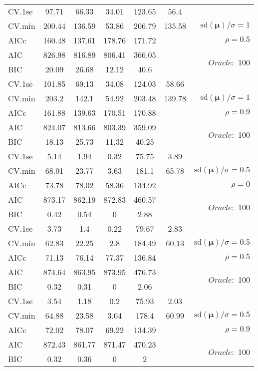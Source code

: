 \begin{table}
\begin{center}
\begin{tabular}{l*{5}{c}|r}
 \hline 
CV.1se & 97.71 & 66.33 & 34.01 & 123.65 & 56.4 & \\
CV.min & 200.44 & 136.59 & 53.86 & 206.79 & 135.58 &  $\mathrm{sd}(\mathbf{\mu})/\sigma=1$ \\
AICc & 160.48 & 137.61 & 178.76 & 171.72 & & $\rho=0.5$ \\
AIC & 826.98 & 816.89 & 806.41 & 366.05 & &  \multirow{2}{*}{$Oracle: $ 100} \\
BIC & 20.09 & 26.68 & 12.12 & 40.6 & &  \\
 \hline 
CV.1se & 101.85 & 69.13 & 34.08 & 124.03 & 58.66 & \\
CV.min & 203.2 & 142.1 & 54.92 & 203.48 & 139.78 &  $\mathrm{sd}(\mathbf{\mu})/\sigma=1$ \\
AICc & 161.88 & 139.63 & 170.51 & 170.88 & & $\rho=0.9$ \\
AIC & 824.07 & 813.66 & 803.39 & 359.09 & &  \multirow{2}{*}{$Oracle: $ 100} \\
BIC & 18.13 & 25.73 & 11.32 & 40.25 & &  \\
 \hline 
CV.1se & 5.14 & 1.94 & 0.32 & 75.75 & 3.89 & \\
CV.min & 68.01 & 23.77 & 3.63 & 181.1 & 65.78 &  $\mathrm{sd}(\mathbf{\mu})/\sigma=0.5$ \\
AICc & 73.78 & 78.02 & 58.36 & 134.92 & & $\rho=0$ \\
AIC & 873.17 & 862.19 & 872.83 & 460.57 & &  \multirow{2}{*}{$Oracle: $ 100} \\
BIC & 0.42 & 0.54 & 0 & 2.88 & &  \\
 \hline 
CV.1se & 3.73 & 1.4 & 0.22 & 79.67 & 2.83 & \\
CV.min & 62.83 & 22.25 & 2.8 & 184.49 & 60.13 &  $\mathrm{sd}(\mathbf{\mu})/\sigma=0.5$ \\
AICc & 71.13 & 76.14 & 77.37 & 136.84 & & $\rho=0.5$ \\
AIC & 874.64 & 863.95 & 873.95 & 476.73 & &  \multirow{2}{*}{$Oracle: $ 100} \\
BIC & 0.32 & 0.31 & 0 & 2.06 & &  \\
 \hline 
CV.1se & 3.54 & 1.18 & 0.2 & 75.93 & 2.03 & \\
CV.min & 64.88 & 23.58 & 3.04 & 178.4 & 60.99 &  $\mathrm{sd}(\mathbf{\mu})/\sigma=0.5$ \\
AICc & 72.02 & 78.07 & 69.22 & 134.39 & & $\rho=0.9$ \\
AIC & 872.43 & 861.77 & 871.47 & 470.23 & &  \multirow{2}{*}{$Oracle: $ 100} \\
BIC & 0.32 & 0.36 & 0 & 2 & &  \\
 \hline 
\end{tabular}
\end{center}
\vspace{-1cm}
\end{table}





